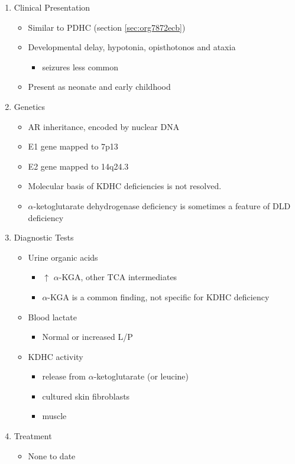 \documentclass{scrartcl}
\begin{document}
\begin{enumerate}
\item Clinical Presentation
\label{sec:org22ba2fc}
\begin{itemize}
\item Similar to PDHC (section \ref{sec:org7872ecb})
\item Developmental delay, hypotonia, opisthotonos and ataxia
\begin{itemize}
\item seizures less common
\end{itemize}
\item Present as neonate and early childhood
\end{itemize}

\item Genetics
\label{sec:org3b17868}
\begin{itemize}
\item AR inheritance, encoded by nuclear DNA
\item E1 gene mapped to 7p13
\item E2 gene mapped to 14q24.3
\item Molecular basis of KDHC deficiencies is not resolved.
\item \(\alpha\)-ketoglutarate dehydrogenase deficiency is sometimes a feature of DLD deficiency
\end{itemize}

\item Diagnostic Tests
\label{sec:orgb6c6767}
\begin{itemize}
\item Urine organic acids
\begin{itemize}
\item \(\uparrow\) \(\alpha\)-KGA, \textpm{} other TCA intermediates
\item \(\alpha\)-KGA is a common finding, not specific for KDHC deficiency
\end{itemize}
\item Blood lactate
\begin{itemize}
\item Normal or increased L/P
\end{itemize}
\item KDHC activity
\begin{itemize}
\item {} release from \ce{[1-^14C]} \(\alpha\)-ketoglutarate (or \ce{[1-^14C]} leucine)
\item cultured skin fibroblasts
\item muscle
\end{itemize}
\end{itemize}

\item Treatment
\label{sec:orgeca8470}
\begin{itemize}
\item None to date
\end{itemize}
\end{enumerate}
\end{document}
